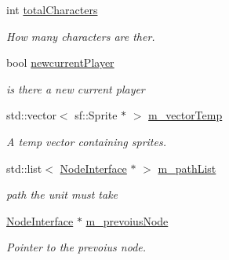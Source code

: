 \begin{DoxyCompactItemize}
\mbox{\label{class_scene_a4a072bf6c3a790daef87ff8268e4556d}} 
int \mbox{\hyperlink{class_scene_a4a072bf6c3a790daef87ff8268e4556d}{total\+Characters}}
\begin{DoxyCompactList}\small\item\em How many characters are ther. \end{DoxyCompactList}\item 
\mbox{\label{class_scene_abbb010c89e64b117c17ed75fbfd13e49}} 
bool \mbox{\hyperlink{class_scene_abbb010c89e64b117c17ed75fbfd13e49}{newcurrent\+Player}}
\begin{DoxyCompactList}\small\item\em is there a new current player \end{DoxyCompactList}\item 
\mbox{\label{class_scene_ade40d20e64f9d4ccc1448936b47b9c00}} 
std\+::vector$<$ sf\+::\+Sprite $\ast$ $>$ \mbox{\hyperlink{class_scene_ade40d20e64f9d4ccc1448936b47b9c00}{m\+\_\+vector\+Temp}}
\begin{DoxyCompactList}\small\item\em A temp vector containing sprites. \end{DoxyCompactList}\item 
\mbox{\label{class_scene_a91f8a53d7d0e9f6087baa3fa30c432e4}} 
std\+::list$<$ \mbox{\hyperlink{class_node_interface}{Node\+Interface}} $\ast$ $>$ \mbox{\hyperlink{class_scene_a91f8a53d7d0e9f6087baa3fa30c432e4}{m\+\_\+path\+List}}
\begin{DoxyCompactList}\small\item\em path the unit must take \end{DoxyCompactList}\item 
\mbox{\label{class_scene_ad0e56315eddcb1259330fcd33340cdf6}} 
\mbox{\hyperlink{class_node_interface}{Node\+Interface}} $\ast$ \mbox{\hyperlink{class_scene_ad0e56315eddcb1259330fcd33340cdf6}{m\+\_\+prevoius\+Node}}
\begin{DoxyCompactList}\small\item\em Pointer to the prevoius node. \end{DoxyCompactList}\item 
\mbox{\label{class_scene_af60873fd6cdd2e5c28ab765866d048f5}} 

\end{DoxyCompactItemize}
